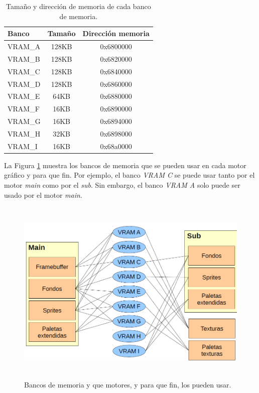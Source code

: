 \begin{table}[t]
\centering
\caption{Tamaño y dirección de memoria de cada banco de memoria.}
\begin{tabular}{|l |c | c|}
\hline
Banco & Tamaño &  Dirección memoria  \\
\hline
\hline
VRAM\_A & 128KB & 0x6800000 \\
\hline
VRAM\_B & 128KB  &	0x6820000 \\
\hline
VRAM\_C & 128KB  &	0x6840000 \\
\hline
VRAM\_D	& 128KB  &	0x6860000 \\
\hline
VRAM\_E	& 64KB  &	0x6880000\\
\hline
VRAM\_F	& 16KB  &	0x6890000 \\
\hline
VRAM\_G	& 16KB  &	0x6894000\\
\hline
VRAM\_H	& 32KB & 	0x6898000 \\
\hline
VRAM\_I	& 16KB  &	0x68a0000\\
\hline
\end{tabular}
\label{tab_c5_vram}
\end{table}

La Figura \ref{fig_c5_vram} muestra los bancos de memoria que se pueden usar en cada motor gráfico y para que fin. Por ejemplo, el banco \textit{VRAM C} se puede usar tanto por el motor \textit{main} como por el \textit{sub}. Sin embargo, el banco \textit{VRAM A} solo puede ser usado por el motor \textit{main}.

\begin{figure}[t]
	\centering
	\includegraphics[height=9cm]{Figuras/C5/c5_vram.png}
	\caption{Bancos de memoria y que motores, y para que fin, los pueden usar.}
	\label{fig_c5_vram}
\end{figure}
